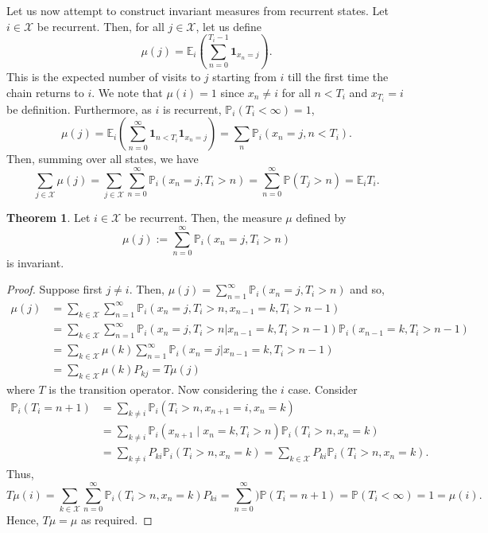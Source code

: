 \documentclass[]{article}
\theoremstyle{definition}
\newtheorem{theorem}{Theorem}
\theoremstyle{definition}
\begin{document}
Let us now attempt to construct invariant measures from recurrent states. 
Let \(i \in \mathcal{X}\) be recurrent. Then, for all \(j \in \mathcal{X}\), let 
us define 
\[\mu(j) = \mathbb{E}_i\left(\sum_{n = 0}^{T_i - 1} \mathbf{1}_{x_n = j}\right).\]
This is the expected number of visits to \(j\) starting from \(i\) till the 
first time the chain returns to \(i\). We note that \(\mu(i) = 1\) since 
\(x_n \neq i\) for all \(n < T_i\) and \(x_{T_i} = i\) be definition.
Furthermore, as \(i\) is recurrent, \(\mathbb{P}_i(T_i < \infty) = 1\),
\[\mu(j) = \mathbb{E}_i\left(\sum_{n = 0}^\infty \mathbf{1}_{n < T_i} \mathbf{1}_{x_n = j}\right)
  = \sum_n \mathbb{P}_i(x_n = j, n < T_i).\]
Then, summing over all states, we have 
\[\sum_{j \in \mathcal{X}} \mu(j) = \sum_{j \in \mathcal{X}} \sum_{n = 0}^\infty \mathbb{P}_i(x_n = j, T_i > n) = 
  \sum_{n = 0}^\infty \mathbb{P}(T_j > n) = \mathbb{E}_i T_i.\]

\begin{theorem}
  Let \(i \in \mathcal{X}\) be recurrent. Then, the measure \(\mu\) defined by  
  \[\mu(j) := \sum_{n = 0}^\infty \mathbb{P}_i(x_n = j, T_i > n)\]
  is invariant.
\end{theorem}
\begin{proof}
  Suppose first \(j \neq i\). Then, \(\mu(j) = \sum_{n = 1}^\infty \mathbb{P}_i(x_n = j, T_i > n)\)
  and so, 
  \[\begin{split}
    \mu(j) & = \sum_{k \in \mathcal{X}}\sum_{n = 1}^\infty \mathbb{P}_i(x_n = j, T_i > n, x_{n - 1} = k, T_i > n - 1)\\
    & = \sum_{k \in \mathcal{X}}\sum_{n = 1}^\infty \mathbb{P}_i(x_n = j, T_i > n | x_{n - 1} = k, T_i > n - 1)\mathbb{P}_i(x_{n - 1} = k, T_i > n - 1)\\
    & = \sum_{k \in \mathcal{X}}\mu(k)\sum_{n = 1}^\infty \mathbb{P}_i(x_n = j | x_{n - 1} = k, T_i > n - 1)\\
    & = \sum_{k \in \mathcal{X}}\mu(k)P_{kj} = T\mu(j)
  \end{split}\]
  where \(T\) is the transition operator. Now considering the \(i\) case. 
  Consider 
  \[\begin{split}
    \mathbb{P}_i(T_i = n + 1) & = \sum_{k \neq i}\mathbb{P}_i(T_i > n, x_{n + 1} = i, x_n = k)\\
    & = \sum_{k \neq i} \mathbb{P}_i(x_{n + 1} \mid x_n = k, T_i > n) \mathbb{P}_i(T_i > n, x_n = k)\\
    & = \sum_{k \neq i} P_{ki} \mathbb{P}_i(T_i > n, x_n = k) = \sum_{k \in \mathcal{X}} P_{ki}\mathbb{P}_i(T_i > n, x_n = k).
  \end{split}\]
  Thus, 
  \[T\mu(i) = \sum_{k \in \mathcal{X}} \sum_{n = 0}^\infty \mathbb{P}_i(T_i > n, x_n = k) P_{ki} 
    = \sum_{n = 0}^\infty) \mathbb{P}(T_i = n + 1) = \mathbb{P}(T_i < \infty) = 1 = \mu(i).\]
  Hence, \(T\mu = \mu\) as required.
\end{proof}
\end{document}
